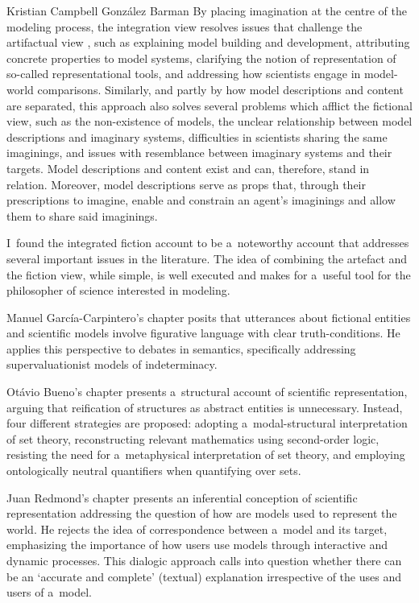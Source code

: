 \begin{recengenv}{Kristian Campbell González Barman}
By placing imagination at the centre of the modeling process, the integration view resolves issues that challenge the artifactual view
\parencite*[][p.173]{cassini_models_2021}, %
 such as explaining model building and development, attributing concrete properties to model systems, clarifying the notion of representation of so-called representational tools, and addressing how scientists engage in model-world comparisons. Similarly, and partly by how model descriptions and content are separated, this approach also solves several problems which afflict the fictional view, such as the non-existence of models, the unclear relationship between model descriptions and imaginary systems, difficulties in scientists sharing the same imaginings, and issues with resemblance between imaginary systems and their targets. Model descriptions and content exist and can, therefore, stand in relation. Moreover, model descriptions serve as props that, through their prescriptions to imagine, enable and constrain an agent's imaginings and allow them to share said imaginings.

I~found the integrated fiction account to be a~noteworthy account that addresses several important issues in the literature. The idea of combining the artefact and the fiction view, while simple, is well executed and makes for a~useful tool for the philosopher of science interested in modeling.

Manuel García-Carpintero's chapter posits that utterances about fictional entities and scientific models involve figurative language with clear truth-conditions. He applies this perspective to debates in semantics, specifically addressing supervaluationist models of indeterminacy.

Otávio Bueno's chapter presents a~structural account of scientific representation, arguing that reification of structures as abstract entities is unnecessary. Instead, four different strategies are proposed: adopting a~modal-structural interpretation of set theory, reconstructing relevant mathematics using second-order logic, resisting the need for a~metaphysical interpretation of set theory, and employing ontologically neutral quantifiers when quantifying over sets.

Juan Redmond's chapter presents an inferential conception of scientific representation addressing the question of how are models used to represent the world. He rejects the idea of correspondence between a~model and its target, emphasizing the importance of how users use models through interactive and dynamic processes. This dialogic approach calls into question whether there can be an ‘accurate and complete' (textual) explanation irrespective of the uses and users of a~model.


\end{recengenv}
